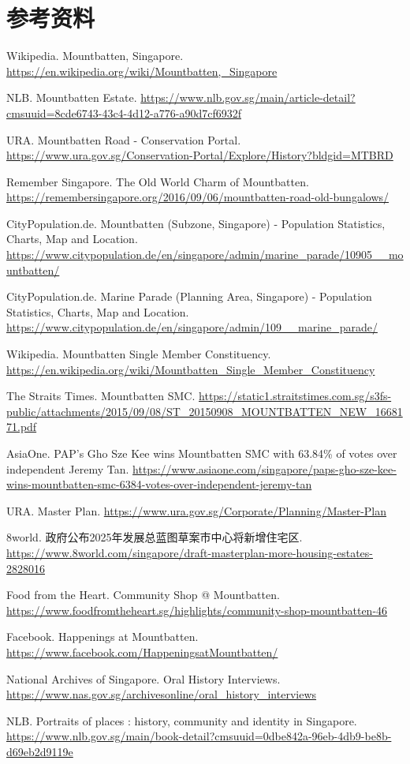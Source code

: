\documentclass[11pt,a4paper,twoside,openany]{book}
\begin{document}
\section*{参考资料}
\begin{enumerate}[label={[\arabic*]},leftmargin=*,topsep=2pt,itemsep=1pt,parsep=0pt]
  \item Wikipedia. Mountbatten, Singapore. \url{https://en.wikipedia.org/wiki/Mountbatten,_Singapore}
  \item NLB. Mountbatten Estate. \url{https://www.nlb.gov.sg/main/article-detail?cmsuuid=8cde6743-43c4-4d12-a776-a90d7cf6932f}
  \item URA. Mountbatten Road - Conservation Portal. \url{https://www.ura.gov.sg/Conservation-Portal/Explore/History?bldgid=MTBRD}
  \item Remember Singapore. The Old World Charm of Mountbatten. \url{https://remembersingapore.org/2016/09/06/mountbatten-road-old-bungalows/}
  \item CityPopulation.de. Mountbatten (Subzone, Singapore) - Population Statistics, Charts, Map and Location. \url{https://www.citypopulation.de/en/singapore/admin/marine_parade/10905__mountbatten/}
  \item CityPopulation.de. Marine Parade (Planning Area, Singapore) - Population Statistics, Charts, Map and Location. \url{https://www.citypopulation.de/en/singapore/admin/109__marine_parade/}
  \item Wikipedia. Mountbatten Single Member Constituency. \url{https://en.wikipedia.org/wiki/Mountbatten_Single_Member_Constituency}
  \item The Straits Times. Mountbatten SMC. \url{https://static1.straitstimes.com.sg/s3fs-public/attachments/2015/09/08/ST_20150908_MOUNTBATTEN_NEW_1668171.pdf}
  \item AsiaOne. PAP's Gho Sze Kee wins Mountbatten SMC with 63.84\% of votes over independent Jeremy Tan. \url{https://www.asiaone.com/singapore/paps-gho-sze-kee-wins-mountbatten-smc-6384-votes-over-independent-jeremy-tan}
  \item URA. Master Plan. \url{https://www.ura.gov.sg/Corporate/Planning/Master-Plan}
  \item 8world. 政府公布2025年发展总蓝图草案市中心将新增住宅区. \url{https://www.8world.com/singapore/draft-masterplan-more-housing-estates-2828016}
  \item Food from the Heart. Community Shop @ Mountbatten. \url{https://www.foodfromtheheart.sg/highlights/community-shop-mountbatten-46}
  \item Facebook. Happenings at Mountbatten. \url{https://www.facebook.com/HappeningsatMountbatten/}
  \item National Archives of Singapore. Oral History Interviews. \url{https://www.nas.gov.sg/archivesonline/oral_history_interviews}
  \item NLB. Portraits of places : history, community and identity in Singapore. \url{https://www.nlb.gov.sg/main/book-detail?cmsuuid=0dbe842a-96eb-4db9-be8b-d69eb2d9119e}
\end{enumerate}
\end{document}
